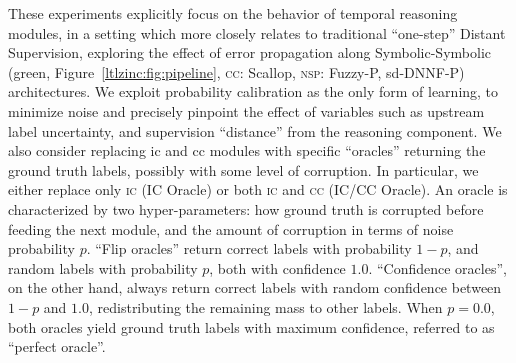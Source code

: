 These experiments explicitly focus on the behavior of temporal reasoning modules, in a setting which more closely relates to traditional ``one-step'' Distant Supervision, exploring the effect of error propagation along Symbolic-Symbolic (green, Figure~\ref{ltlzinc:fig:pipeline}, \textsc{cc}: Scallop, \textsc{nsp}: Fuzzy-P, sd-DNNF-P) architectures.
We exploit probability calibration as the only form of learning, to minimize noise and precisely pinpoint the effect of variables such as upstream label uncertainty, and supervision ``distance'' from the reasoning component. We also consider replacing {\sc ic} and {\sc cc} modules with specific ``oracles'' returning the ground truth labels, possibly with some level of corruption. In particular, we either replace only \textsc{ic} (IC Oracle) or both \textsc{ic} and \textsc{cc} (IC/CC Oracle). %
%
An oracle is characterized by two hyper-parameters: how ground truth is corrupted before feeding the next module, and the amount of corruption in terms of noise probability $p$. ``Flip oracles'' return correct labels with probability $1-p$, and random labels with probability $p$, both with confidence $1.0$. ``Confidence oracles'', on the other hand, always return correct labels with random confidence between $1-p$ and $1.0$, redistributing the remaining mass to other labels.
When $p = 0.0$, both oracles yield ground truth labels with maximum confidence, referred to as ``perfect oracle''.



